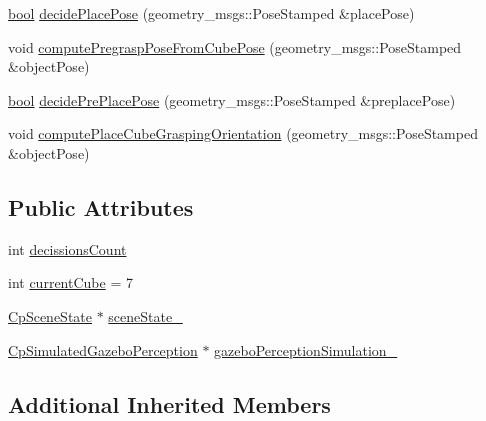 \begin{DoxyCompactItemize}
\item 
\hyperlink{classbool}{bool} \hyperlink{classsm__moveit__wine__serve_1_1cl__perception__system_1_1ClPerceptionSystem_a933bd942b37429d282180d19734aab85}{decide\+Place\+Pose} (geometry\+\_\+msgs\+::\+Pose\+Stamped \&place\+Pose)
\item 
void \hyperlink{classsm__moveit__wine__serve_1_1cl__perception__system_1_1ClPerceptionSystem_ac02f1e505d29490a1df0237ba2e4ef29}{compute\+Pregrasp\+Pose\+From\+Cube\+Pose} (geometry\+\_\+msgs\+::\+Pose\+Stamped \&object\+Pose)
\item 
\hyperlink{classbool}{bool} \hyperlink{classsm__moveit__wine__serve_1_1cl__perception__system_1_1ClPerceptionSystem_aefec592f3da47686506a063602d3f868}{decide\+Pre\+Place\+Pose} (geometry\+\_\+msgs\+::\+Pose\+Stamped \&preplace\+Pose)
\item 
void \hyperlink{classsm__moveit__wine__serve_1_1cl__perception__system_1_1ClPerceptionSystem_af789dcdfce466401dc70d0b3224d1093}{compute\+Place\+Cube\+Grasping\+Orientation} (geometry\+\_\+msgs\+::\+Pose\+Stamped \&object\+Pose)
\end{DoxyCompactItemize}
\subsection*{Public Attributes}
\begin{DoxyCompactItemize}
\item 
int \hyperlink{classsm__moveit__wine__serve_1_1cl__perception__system_1_1ClPerceptionSystem_a84f1f945f2fdc54fa10ae9272122bd93}{decissions\+Count}
\item 
int \hyperlink{classsm__moveit__wine__serve_1_1cl__perception__system_1_1ClPerceptionSystem_a2b902d074d73aac23e3525646e08d50f}{current\+Cube} = 7
\item 
\hyperlink{classsm__moveit__wine__serve_1_1cl__perception__system_1_1CpSceneState}{Cp\+Scene\+State} $\ast$ \hyperlink{classsm__moveit__wine__serve_1_1cl__perception__system_1_1ClPerceptionSystem_addfd893a6f290ffc73d7f55cce9e637b}{scene\+State\+\_\+}
\item 
\hyperlink{classsm__moveit__wine__serve_1_1cl__perception__system_1_1CpSimulatedGazeboPerception}{Cp\+Simulated\+Gazebo\+Perception} $\ast$ \hyperlink{classsm__moveit__wine__serve_1_1cl__perception__system_1_1ClPerceptionSystem_a91db49d22e40d2efaa29a9d18c61d7da}{gazebo\+Perception\+Simulation\+\_\+}
\end{DoxyCompactItemize}
\subsection*{Additional Inherited Members}


